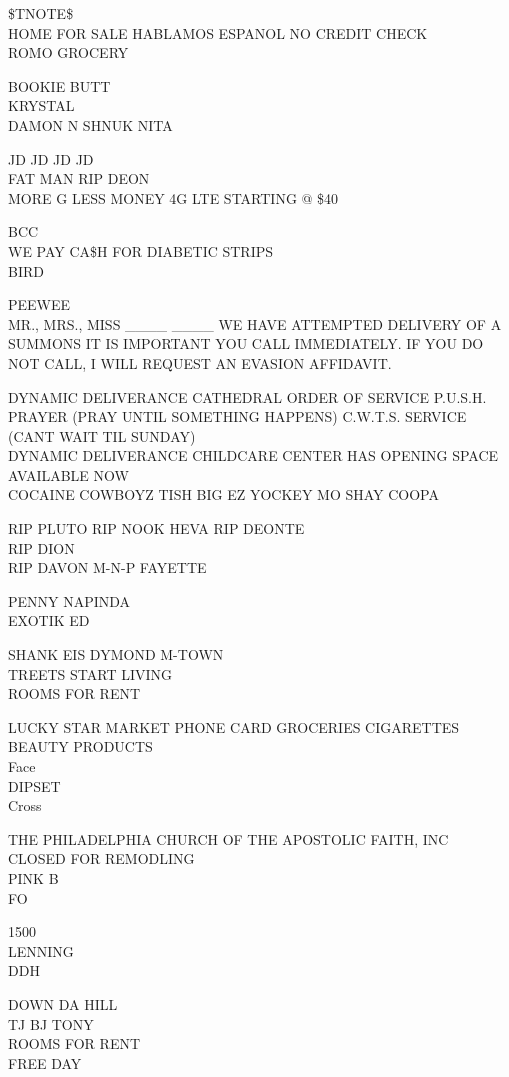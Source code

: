\documentclass[10pt,letterpaper]{article}
\begin{document}
\$TNOTE\$\\
HOME FOR SALE HABLAMOS ESPANOL NO CREDIT CHECK\\
ROMO GROCERY

BOOKIE BUTT\\
KRYSTAL\\
DAMON N SHNUK NITA

JD JD JD JD\\
FAT MAN RIP DEON\\
MORE G LESS MONEY 4G LTE STARTING @ \$40

BCC\\
WE PAY CA\$H FOR DIABETIC STRIPS\\
BIRD

PEEWEE\\
MR., MRS., MISS \_\_\_\_ \_\_\_\_ WE HAVE ATTEMPTED DELIVERY OF A SUMMONS IT IS IMPORTANT YOU CALL IMMEDIATELY.  IF YOU DO NOT CALL, I WILL REQUEST AN EVASION AFFIDAVIT.

DYNAMIC DELIVERANCE CATHEDRAL ORDER OF SERVICE P.U.S.H. PRAYER (PRAY UNTIL SOMETHING HAPPENS) C.W.T.S. SERVICE (CANT WAIT TIL SUNDAY)\\
DYNAMIC DELIVERANCE CHILDCARE CENTER HAS OPENING  SPACE AVAILABLE NOW\\
COCAINE COWBOYZ TISH BIG EZ YOCKEY MO SHAY COOPA

RIP PLUTO RIP NOOK HEVA RIP DEONTE\\
RIP DION\\
RIP DAVON M{-}N{-}P FAYETTE

PENNY NAPINDA\\
EXOTIK ED

SHANK EIS DYMOND M{-}TOWN\\
TREETS START LIVING\\
ROOMS FOR RENT

LUCKY STAR MARKET PHONE CARD GROCERIES CIGARETTES BEAUTY PRODUCTS\\
Face\\
DIPSET\\
Cross

THE PHILADELPHIA CHURCH OF THE APOSTOLIC FAITH, INC\\
CLOSED FOR REMODLING\\
PINK B\\
FO

1500\\
LENNING\\
DDH

DOWN DA HILL\\
TJ BJ TONY\\
ROOMS FOR RENT\\
FREE DAY
\end{document}
